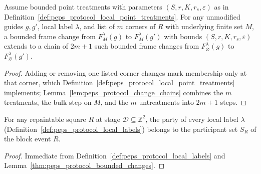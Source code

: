 \begin{lemma}
    \label{thm:peps_protocol_sheet_operation_chains}
    \leanok
    Assume bounded point treatments with parameters $(S,r,K,r_s,\varepsilon)$ as in Definition~\ref{def:peps_protocol_local_point_treatments}. For any unmodified guides $g,g'$, local label $\lambda$, and list of $m$ corners of $R$ with underlying finite set $M$, a bounded frame change from $F_M^\lambda(g)$ to $F_M^\lambda(g')$ with bounds $(S,r,K,r_s,\varepsilon)$ extends to a chain of $2m+1$ such bounded frame changes from $F_\varnothing^\lambda(g)$ to $F_\varnothing^\lambda(g')$.
\end{lemma}

\begin{proof}\leanok
    Adding or removing one listed corner changes mark membership only at that corner, which Definition~\ref{def:peps_protocol_local_point_treatments} implements; Lemma~\ref{lem:peps_protocol_change_chains} combines the $m$ treatments, the bulk step on $M$, and the $m$ untreatments into $2m+1$ steps.
\end{proof}

\begin{lemma}
    \label{thm:peps_protocol_local_label_event_uses}
    \leanok
    For any repaintable square $R$ at stage $\mathcal D\subseteq\mathbb Z^2$, the party of every local label $\lambda$ (Definition~\ref{def:peps_protocol_local_labels}) belongs to the participant set $S_R$ of the block event $R$.
\end{lemma}

\begin{proof}\leanok
    Immediate from Definition~\ref{def:peps_protocol_local_labels} and Lemma~\ref{thm:peps_protocol_bounded_changes}.
\end{proof}

